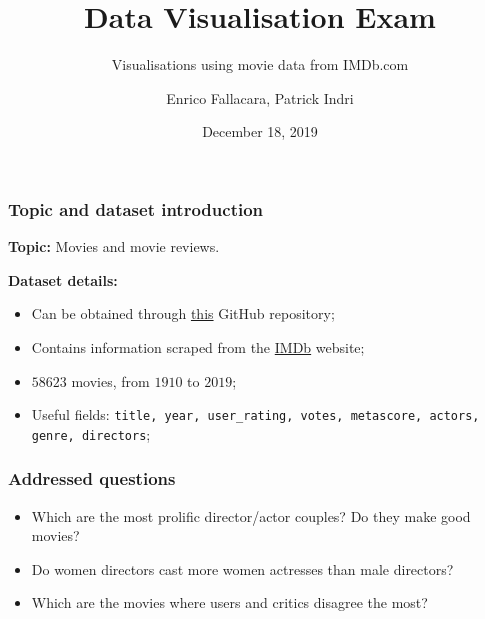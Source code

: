 \documentclass[aspectratio=169]{beamer}
\title{Data Visualisation Exam}
\subtitle{Visualisations using movie data from IMDb.com}
\author{Enrico Fallacara, Patrick Indri}
\date{December 18, 2019}
\begin{document}
  \setcounter{showSlideNumbers}{0}

  \frame{\titlepage}


  \setcounter{framenumber}{0}
  \setcounter{showSlideNumbers}{1}


  \begin{frame}
    \frametitle{Topic and dataset introduction}

    \textbf{Topic:} Movies and movie reviews.

    \vspace{1em} 

    \textbf{Dataset details:} 

    \vspace{0.5em} 

    \begin{itemize}
      \setlength\itemsep{1em}
      \item Can be obtained through \href{https://github.com/dojutsu-user/IMDB-Scraper}{this} GitHub repository;
      \item Contains information scraped from the \href{https://imdb.com}{IMDb} website;
      \item $58623$ movies, from $1910$ to $2019$;
      \item Useful fields: \texttt{title, year, user\_rating, votes, metascore, actors, genre, directors};
    \end{itemize}

    \vspace{1em} 


  \end{frame}



  \begin{frame}
    \frametitle{Addressed questions}

    \begin{itemize}
      \setlength\itemsep{1em}
      \item Which are the most prolific director/actor couples? Do they make good movies?
      \item Do women directors cast more women actresses than male directors?
      \item Which are the movies where users and critics disagree the most?
    \end{itemize}

  \end{frame}
\end{document}
